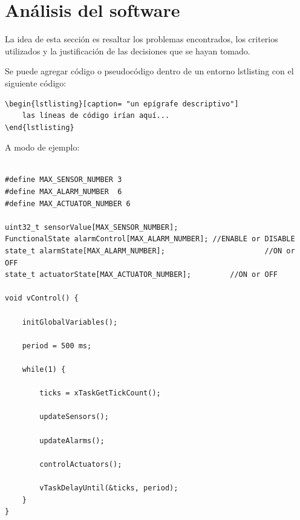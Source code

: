\section{Análisis del software}
 
La idea de esta sección es resaltar los problemas encontrados, los criterios utilizados y la justificación de las decisiones que se hayan tomado.

Se puede agregar código o pseudocódigo dentro de un entorno lstlisting con el siguiente código:

\begin{verbatim}
\begin{lstlisting}[caption= "un epígrafe descriptivo"]
	las líneas de código irían aquí...
\end{lstlisting}
\end{verbatim}

A modo de ejemplo:

\begin{lstlisting}[label=cod:vControl,caption=Pseudocódigo del lazo principal de control.]  % Start your code-block

#define MAX_SENSOR_NUMBER 3
#define MAX_ALARM_NUMBER  6
#define MAX_ACTUATOR_NUMBER 6

uint32_t sensorValue[MAX_SENSOR_NUMBER];		
FunctionalState alarmControl[MAX_ALARM_NUMBER];	//ENABLE or DISABLE
state_t alarmState[MAX_ALARM_NUMBER];						//ON or OFF
state_t actuatorState[MAX_ACTUATOR_NUMBER];			//ON or OFF

void vControl() {

	initGlobalVariables();
	
	period = 500 ms;
		
	while(1) {

		ticks = xTaskGetTickCount();
		
		updateSensors();
		
		updateAlarms();
		
		controlActuators();
		
		vTaskDelayUntil(&ticks, period);
	}
}
\end{lstlisting}


